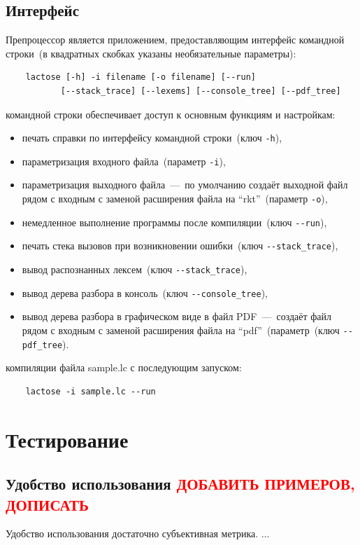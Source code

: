 \documentclass[12pt,a4paper,oneside]{extarticle}
\begin{document}
    \subsection{Интерфейс}
        Препроцессор является приложением, предоставляющим интерфейс командной строки~(в квадратных скобках указаны необязательные параметры):
        \begin{lstlisting}        
    lactose [-h] -i filename [-o filename] [--run]
           [--stack_trace] [--lexems] [--console_tree] [--pdf_tree]
        \end{lstlisting}

         командной строки обеспечивает доступ к основным функциям и настройкам:
        \begin{itemize}
                \item печать справки по интерфейсу командной строки~(ключ \lstinline$-h$),
                \item параметризация входного файла~(параметр \lstinline$-i$),
                \item параметризация выходного файла~---~по умолчанию создаёт выходной файл рядом с входным с заменой расширения файла на ``rkt''~(параметр \lstinline$-o$),
                \item немедленное выполнение программы после компиляции~(ключ \lstinline$--run$),
                \item печать стека вызовов при возникновении ошибки~(ключ \lstinline$--stack_trace$),
                \item вывод распознанных лексем~(ключ \lstinline$--stack_trace$),
                \item вывод дерева разбора в консоль~(ключ \lstinline$--console_tree$),
                \item вывод дерева разбора в графическом виде в файл PDF~---~создаёт файл рядом с входным с заменой расширения файла на ``pdf''~(параметр~(ключ \lstinline$--pdf_tree$).
        \end{itemize}

         компиляции файла sample.lc с последующим запуском:
        \begin{lstlisting}        
    lactose -i sample.lc --run
        \end{lstlisting}
\clearpage

\section{Тестирование}
    \subsection{Удобство использования \textcolor{red}{ДОБАВИТЬ ПРИМЕРОВ, ДОПИСАТЬ}}
        Удобство использования достаточно субъективная метрика. ...
\end{document}
